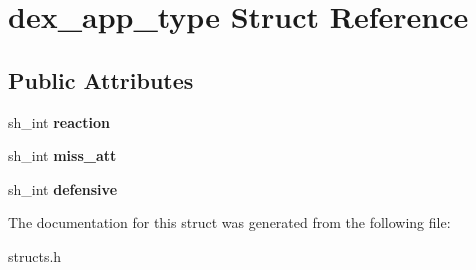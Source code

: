 \hypertarget{structdex__app__type}{}\section{dex\+\_\+app\+\_\+type Struct Reference}
\label{structdex__app__type}
\subsection*{Public Attributes}
\begin{DoxyCompactItemize}
\item 
\mbox{\label{structdex__app__type_a3be6655dd1aea1c7fd23e77340498c63}} 
sh\+\_\+int {\bfseries reaction}
\item 
\mbox{\label{structdex__app__type_a6c52a04fe4df03fc34ad35b5797fc11e}} 
sh\+\_\+int {\bfseries miss\+\_\+att}
\item 
\mbox{\label{structdex__app__type_af4cc9f4211322bfe480e666435fc9fff}} 
sh\+\_\+int {\bfseries defensive}
\end{DoxyCompactItemize}


The documentation for this struct was generated from the following file\+:\begin{DoxyCompactItemize}
\item 
structs.\+h\end{DoxyCompactItemize}
